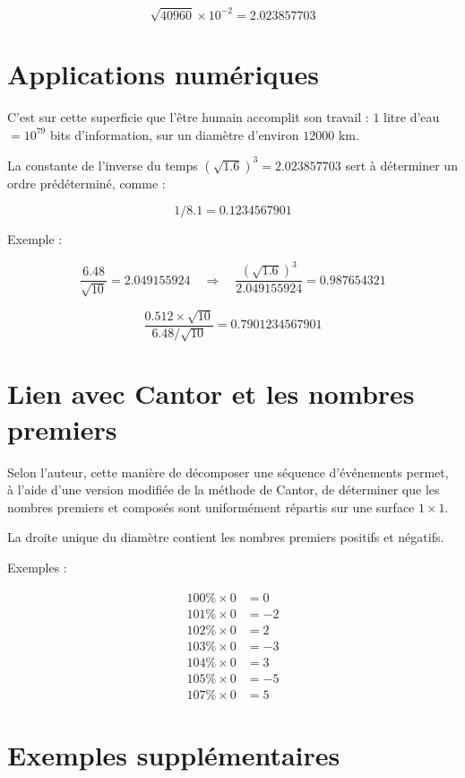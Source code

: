 \documentclass[11pt,a4paper]{article}
\begin{document}
\[
\sqrt{40960} \times 10^{-2} = 2.023857703
\]



\section{Applications numériques}

C’est sur cette superficie que l’être humain accomplit son travail :  
\(1\) litre d’eau \(= 10^{79}\) bits d’information, sur un diamètre d’environ \(12000\) km.

La constante de l’inverse du temps \((\sqrt{1.6})^3 = 2.023857703\) sert à déterminer un ordre prédéterminé, comme :


\[
1/8.1 = 0.1234567901
\]



Exemple :


\[
\frac{6.48}{\sqrt{10}} = 2.049155924
\quad\Rightarrow\quad
\frac{(\sqrt{1.6})^3}{2.049155924} = 0.987654321
\]





\[
\frac{0.512 \times \sqrt{10}}{6.48/\sqrt{10}} = 0.7901234567901
\]



\section{Lien avec Cantor et les nombres premiers}

Selon l’auteur, cette manière de décomposer une séquence d’événements permet, à l’aide d’une version modifiée de la méthode de Cantor, de déterminer que les nombres premiers et composés sont uniformément répartis sur une surface \(1 \times 1\).

La droite unique du diamètre contient les nombres premiers positifs et négatifs.

Exemples :


\[
\begin{aligned}
100\% \times 0 &= 0 \\
101\% \times 0 &= -2 \\
102\% \times 0 &= 2 \\
103\% \times 0 &= -3 \\
104\% \times 0 &= 3 \\
105\% \times 0 &= -5 \\
107\% \times 0 &= 5
\end{aligned}
\]



\section{Exemples supplémentaires}
\end{document}
